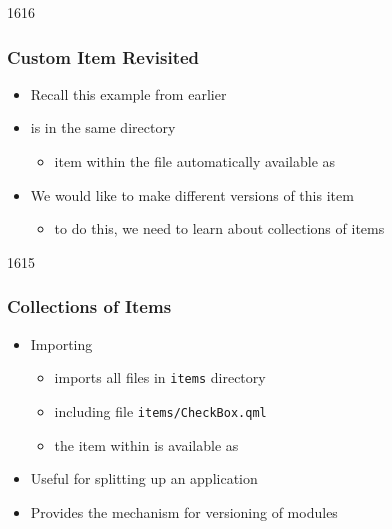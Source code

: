 
\begin{slide}{1616}\frametitle{Custom Item Revisited}


\vspace*{0.5em}
\begin{itemize}
\item Recall this example from earlier
\item {} is in the same directory
  \begin{itemize}
  \item item within the file automatically available as 
  \end{itemize}
\item We would like to make different versions of this item
  \begin{itemize}
  \item to do this, we need to learn about collections of items
  \end{itemize}
\end{itemize}

\end{slide}


\begin{slide}{1615}\frametitle{Collections of Items}


\begin{itemize}
\item Importing 
  \begin{itemize}
  \item imports all files in \texttt{items} directory
  \item including file \texttt{items/CheckBox.qml}
  \item the item within is available as 
  \end{itemize}
\item Useful for splitting up an application
\item Provides the mechanism for versioning of modules
\end{itemize}


\end{slide}

